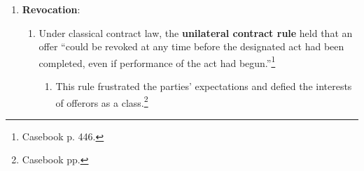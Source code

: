 \begin{enumerate}
\begin{enumerate}
        offer in any way. Modern contract law has softened the rule in two 
        ways:
        \begin{enumerate}
            \item UCC \S\ 2-207---see below (battle of the forms).
            \item Restatement Second \S\ 59: an acceptance containing 
            additional terms is binding if acceptance does not depend on the 
            offeror's assent to the additional terms.
        \end{enumerate}
        \item A seller can \textbf{renew an offer by implication}.  
        \emph{Livingstone v. Evans}.
        \begin{enumerate}
            \item For instance---S: I'll sell for \$1,800. B: How about 
            \$1,600?  S: Sorry, can't go any lower. B: Ok, then, \$1,800.
            \item S renewed the offer by implication.
        \end{enumerate}
        \item If the offeror \textbf{dies or becomes incapacitated}, and the 
        offeree is unaware, then classical contract law holds that the 
        offeror's estate is bound. Some modern courts have criticized the rule 
        as out of step with the parties' intent. Eisenberg proposes that the 
        offeree be able to recover reliance damages but not expectation 
        damages.\footnote{Casebook pp. 437--38.}
        \item \textbf{Receipt} happens when the person conducting the 
        transaction receives it or ``when it would have been brought to his 
        attention if the organization had exercised due 
        diligence~.~.~.''\footnote{Casebook p.  442.}
    \end{enumerate}
    \item \textbf{Revocation}:
    \begin{enumerate}
        \item Under classical contract law, the \textbf{unilateral contract 
        rule} held that an offer ``could be revoked at any time before the 
        designated act had been completed, even if performance of the act had 
        begun.''\footnote{Casebook p. 446.}
        \begin{enumerate}
            \item This rule frustrated the parties' expectations and defied 
            the interests of offerors as a class.\footnote{Casebook pp. 
}
\end{enumerate}
\end{enumerate}
\end{enumerate}
